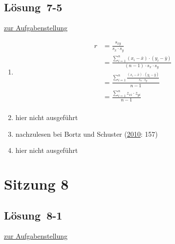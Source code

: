 \documentclass[
  11pt,
  ngerman,
  a4paper,
]{report}
\begin{document}
\hypertarget{loesung-7-5}{%
\subsection{Lösung~7-5}\label{loesung-7-5}}

\protect\hyperlink{aufgabe-7-5}{zur Aufgabenstellung}

\begin{enumerate}
\def\labelenumi{\alph{enumi})}
\item
  \[\begin{aligned}
    r&=\frac{s_{xy}}{s_x\cdot s_y}\\[6pt]
    &=\frac{\sum\limits^n_{i=1}(x_i-\bar{x})\cdot(y_i-\bar{y})}{(n-1)\cdot s_x \cdot s_y}\\[6pt]
    &=\frac{\sum\limits^n_{i=1}\frac{(x_i-\bar{x})\cdot(y_i-\bar{y})}{s_x\cdot s_y}}{n-1}\\[6pt]
    &=\frac{\sum\limits^n_{i=1}z_{xi}\cdot z_{yi}}{n-1}\\[6pt]
    \end{aligned}\]
\item
  hier nicht ausgeführt
\item
  nachzulesen bei Bortz und Schuster (\protect\hyperlink{ref-bortz}{2010}: 157)
\item
  hier nicht ausgeführt
\end{enumerate}

\hypertarget{sitzung-8}{%
\section*{Sitzung 8}\label{sitzung-8}}

\hypertarget{loesung-8-1}{%
\subsection{Lösung~8-1}\label{loesung-8-1}}

\protect\hyperlink{aufgabe-8-1}{zur Aufgabenstellung}
\end{document}
